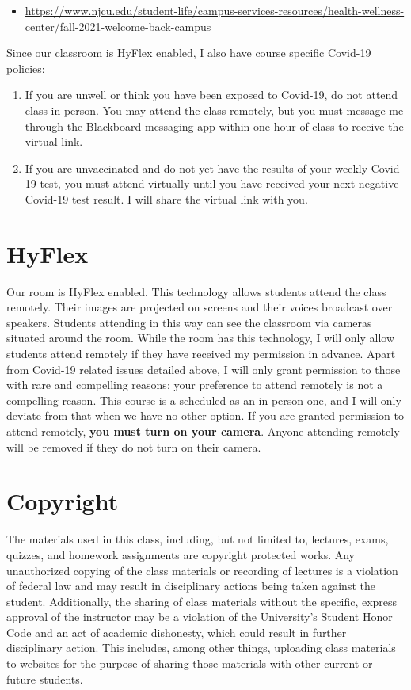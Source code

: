 \documentclass[article,oneside]{memoir}
\begin{document}
\begin{itemize}
\item \href{https://www.njcu.edu/student-life/campus-services-resources/health-wellness-center/fall-2021-welcome-back-campus}{https://www.njcu.edu/student-life/campus-services-resources/health-wellness-center/fall-2021-welcome-back-campus}
\end{itemize}
Since our classroom is HyFlex enabled, I also have course specific Covid-19 policies: 

\begin{enumerate}
\item If you are unwell or think you have been exposed to Covid-19, do not attend class in-person. You may attend the class remotely, but you must message me through the Blackboard messaging app within one hour of class to receive the virtual link. 
\item If you are unvaccinated and do not yet have the results of your weekly Covid-19 test, you must attend virtually until you have received your next negative Covid-19 test result. I will share the virtual link with you. 
\end{enumerate}

\section{HyFlex}
Our room is HyFlex enabled. This technology allows students attend the class remotely. Their images are projected on screens and their voices broadcast over speakers. Students attending in this way can see the classroom via cameras situated around the room. While the room has this technology, I will only allow students attend remotely if they have received my permission in advance. Apart from Covid-19 related issues detailed above, I will only grant permission to those with rare and compelling reasons; your preference to attend remotely is not a compelling reason. This course is a scheduled as an in-person one, and I will only deviate from that when we have no other option. 
If you are granted permission to attend remotely, \textbf{you must turn on your camera}. Anyone attending remotely will be removed if they do not turn on their camera. 


\section{Copyright}
The materials used in this class, including, but not limited to, lectures, exams, quizzes, and homework assignments are copyright protected works.  Any unauthorized copying of the class materials or recording of lectures is a violation of federal law and may result in disciplinary actions being taken against the student.  Additionally, the sharing of class materials without the specific, express approval of the instructor may be a violation of the University's Student Honor Code and an act of academic dishonesty, which could result in further disciplinary action.  This includes, among other things, uploading class materials to websites for the purpose of sharing those materials with other current or future students. 
\end{document}
